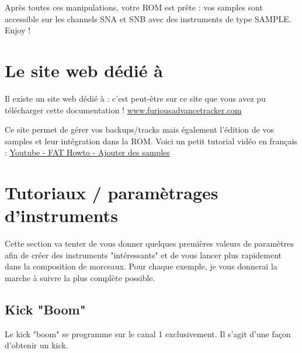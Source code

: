 \documentclass[12pt,a4paper]{article}
\begin{document}
    Après toutes ces manipulations, votre ROM est prête : vos samples sont accessible sur les channels SNA et SNB avec des instruments de type SAMPLE. Enjoy !

    \newpage
    \section{Le site web dédié à \FAT}

    Il existe un site web dédié à \FAT : c'est peut-être sur ce site que vous avez pu télécharger cette documentation !
    \href{http://www.furiousadvancetracker.com}{www.furiousadvancetracker.com}
    \medskip

    Ce site permet de gérer vos backups/tracks mais également l'édition de vos samples et leur intégration dans la ROM.
    Voici un petit tutorial vidéo en français : \href{https://www.youtube.com/watch?v=a9rPzz-6Mgg}{Youtube - FAT Howto - Ajouter des samples}
    \medskip


    \newpage
    \section{Tutoriaux / paramètrages d'instruments}

    Cette section va tenter de vous donner quelques premières valeurs de paramètres afin de créer des instruments "intéressants"
    et de vous lancer plus rapidement dans la composition de morceaux.
    Pour chaque exemple, je vous donnerai la marche à suivre la plus complète possible.

    \subsection{Kick "Boom"}

    Le kick "boom" se programme sur le canal 1 exclusivement. Il s'agit d'une façon d'obtenir un kick.
    \medskip
\end{document}
